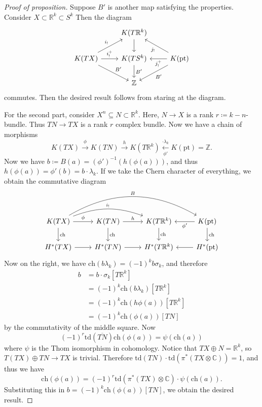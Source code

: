 \documentclass[leqno, openany]{memoir}
\theoremstyle{definition}
\theoremstyle{remark}
\theoremstyle{plain}
\theoremstyle{definition}
\theoremstyle{remark}
\newcommand{\R}{\mathbb{R}}
\newcommand{\C}{\mathbb{C}}
\newcommand{\Z}{\mathbb{Z}}
\newcommand{\mr}[1]{\mathrm{#1}}
\newcommand{\ol}[1]{\overline{#1}}
\begin{document}
\begin{proof}[Proof of proposition]
    Suppose $B'$ is another map satisfying the properties. Consider $X \subset \R^k \subset S^k$ Then the diagram
    \begin{equation*}
    \begin{tikzcd}
                                           & K(T\R^k) \ar{d} \\
        K(TX) \ar{r}{i_!^{+}} \ar{dr}{B'} \ar{ur}{i_!} & K(TS^k) \ar{d}{B'} & K(\mr{pt}) \ar{dl}{B'} \ar{ul}{j_!} \ar{l}{j^+_!} \\
                                           & \Z
    \end{tikzcd}
    \end{equation*}
    commutes. Then the desired result follows from staring at the diagram.

    For the second part, consider $X^n \subseteq N \subset \R^k$. Here, $N \to X$ is a rank $r \coloneqq k-n$-bundle. Thus $TN \to TX$ is a rank $r$ complex bundle. Now we have a chain of morphisms
    \[ K(TX) \xrightarrow{\phi} K(TN) \xrightarrow{h} K(T\R^k) \xleftarrow[{\phi'}]{\cdot \lambda_k} K(\mr{pt}) = \Z. \]
    Now we have $b \coloneqq B(a) = {(\phi')}^{-1}(h(\phi(a)))$, and thus $h(\phi(a)) = \phi'(b) = b \cdot \lambda_k$. If we take the Chern character of everything, we obtain the commutative diagram
    \begin{equation*}
    \begin{tikzcd}
        K(TX) \ar{r}{\phi} \ar{d}{\mr{ch}} \ar[bend left=20]{rr}{i_!} \ar[bend left=30]{rrr}{B} & K(TN) \ar{r}{h} \ar{d}{\mr{ch}} & K(T\R^k) \ar{d}{\mr{ch}} & K(\mr{pt}) \ar{d}{\mr{ch}} \ar{l}{\phi'} \\
        H^*(TX) \ar{r} & H^*(TN) \ar{r} & H^*(T\R^k) & H^*(\mr{pt}) \ar{l}
    \end{tikzcd}
    \end{equation*}
    Now on the right, we have $\mr{ch}(b \lambda_k) = {(-1)}^k b \sigma_k$, and therefore
    \begin{align*}
        b &= b \cdot \sigma_k [T\R^k] \\
          &= {(-1)}^k \mr{ch}(b \lambda_k) [T\R^k] \\
          &= {(-1)}^k \mr{ch}(h \phi(a)) [T\R^k] \\
          &= {(-1)}^k \mr{ch}(\phi(a)) [TN]
    \end{align*}
    by the commutativity of the middle square. Now
    \[ {(-1)}^r \mr{td}(\ol{TN}) \mr{ch}(\phi(a)) = \psi(\mr{ch}(a)) \]
    where $\psi$ is the Thom isomorphism in cohomology. Notice that $TX \oplus N = \R^k$, so $T(TX) \oplus TN \to TX$ is trivial. Therefore $\mr{td}(TN) \cdot \mr{td}(\pi^*(TX \otimes \C)) = 1$, and thus we have
    \[ \mr{ch}(\phi(a)) = {(-1)}^r \mr{td}(\pi^*(TX) \otimes \C) \cdot \psi(\mr{ch}(a)). \]
    Substituting this in $b = {(-1)}^k \mr{ch}(\phi(a)) [TN]$, we obtain the desired result.
\end{proof}
\end{document}
